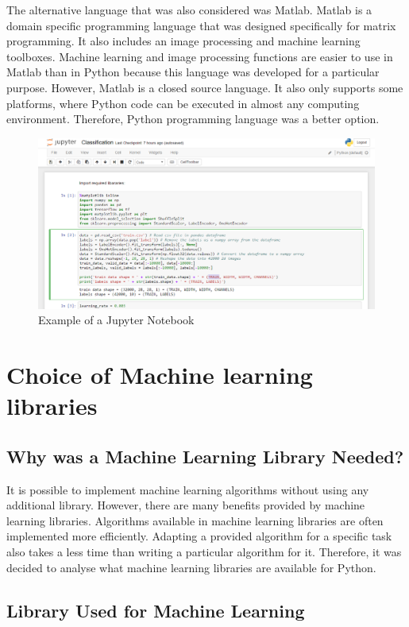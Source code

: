 The alternative language that was also considered was Matlab. Matlab is a domain specific programming language that was designed specifically for matrix programming. It also includes an image processing and machine learning toolboxes. Machine learning and image processing functions are easier to use in Matlab than in Python because this language was developed for a particular purpose. However, Matlab is a closed source language. It also only supports some platforms, where Python code can be executed in almost any computing environment. Therefore, Python programming language was a better option.

\begin{figure}[ht]
\centering
\includegraphics[width=14cm]{Figures/c3/c3jupyter.PNG}
\caption{Example of a Jupyter Notebook}
\label{fig:jupyter}
\end{figure}


\section{Choice of Machine learning libraries}

\subsection{Why was a Machine Learning Library Needed?}

It is possible to implement machine learning algorithms without using any additional library. However, there are many benefits provided by machine learning libraries. Algorithms available in machine learning libraries are often implemented more efficiently. Adapting a provided algorithm for a specific task also takes a less time than  writing a particular algorithm for it. Therefore, it was decided to analyse what machine learning libraries are available for Python.

\subsection{Library Used for Machine Learning }

